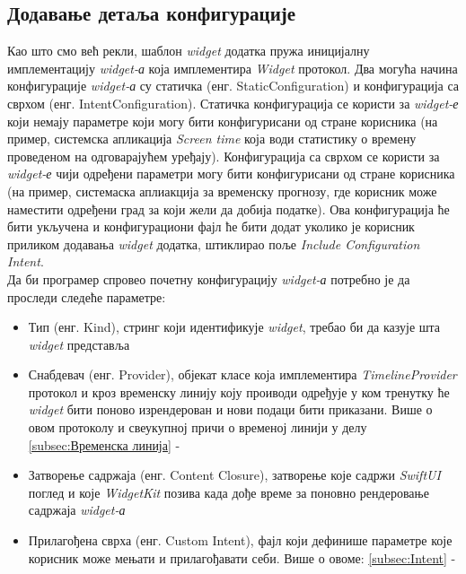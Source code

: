 \documentclass[12pt,oneside]{memoir}
\begin{document}
\subsection{Додавање детаља конфигурације}
\indent Као што смо већ рекли, шаблон \textit{widget} додатка пружа иницијалну имплементацију \textit{widget-а} која имплементира \textit{Widget} протокол. Два могућа начина конфигурације \textit{widget-а} су статичка (енг. StaticConfiguration) и конфигурација са сврхом (енг. IntentConfiguration).
\indent Статичка конфигурација се користи за \textit{widget-е} који немају параметре који могу бити конфигурисани од стране корисника (на пример, системска апликација \textit{Screen time} која води статистику о времену проведеном на одговарајућем уређају).
\indent Конфигурација са сврхом се користи за \textit{widget-е} чији одређени параметри могу бити конфигурисани од стране корисника (на пример, системаска аплиакција за временску прогнозу, где корисник може наместити одређени град за који жели да добија податке). Ова конфигурација ће бити укључена и конфигурациони фајл ће бити додат уколико је корисник приликом додавања \textit{widget} додатка, штиклирао поље \textit{Include Configuration Intent}.
\\
\indent Да би програмер спровео почетну конфигурацију \textit{widget-а} потребно је да проследи следеће параметре:
\begin{itemize}
    \item Тип (енг. Kind), стринг који идентификује \textit{widget}, требао би да казује шта \textit{widget} представља
    \item Снабдевач (енг. Provider), објекат класе која имплементира \textit{TimelineProvider} протокол и кроз временску линију коју проиводи одређује у ком тренутку ће \textit{widget} бити поново изрендерован и нови подаци бити приказани. Више о овом протоколу и свеукупној причи о временој линији у делу \ref{subsec:Временска линија} - 
    \item Затворење садржаја (енг. Content Closure), затворење које садржи \textit{SwiftUI} поглед и које \textit{WidgetKit} позива када дође време за поновно рендеровање садржаја \textit{widget-а}
    \item Прилагођена сврха (енг. Custom Intent), фајл који дефинише параметре које корисник може мењати и прилагођавати себи. Више о овоме: \ref{subsec:Intent} - 
\end{itemize}
\end{document}
